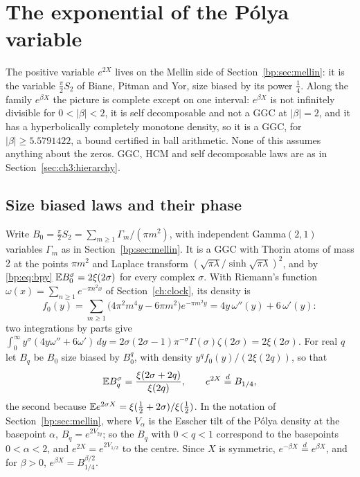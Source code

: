 \section{The exponential of the P\'olya variable}\label{ch:fmexp}

The positive variable $e^{2X}$ lives on the Mellin side of Section~\ref{bp:sec:mellin}: it is the variable $\frac\pi2S_2$ of Biane, Pitman and Yor, size biased by its power $\frac14$. Along the family $e^{\beta X}$ the picture is complete except on one interval: $e^{\beta X}$ is not infinitely divisible for $0<|\beta|<2$, it is self decomposable and not a GGC at $|\beta|=2$, and it has a hyperbolically completely monotone density, so it is a GGC, for $|\beta|\ge5.5791422$, a bound certified in ball arithmetic. None of this assumes anything about the zeros. GGC, HCM and self decomposable laws are as in Section~\ref{sec:ch3:hierarchy}.

\subsection{Size biased laws and their phase}\label{fm:sec:sizebias}

Write $B_0=\frac\pi2S_2=\sum_{m\ge1}\Gamma_m/(\pi m^2)$, with independent Gamma$(2,1)$ variables $\Gamma_m$ as in Section~\ref{bp:sec:mellin}. It is a GGC with Thorin atoms of mass $2$ at the points $\pi m^2$ and Laplace transform $(\sqrt{\pi\lambda}/\sinh\sqrt{\pi\lambda})^2$, and by \eqref{bp:eq:bpy} $\mathbb{E} B_0^\sigma=2\xi(2\sigma)$ for every complex $\sigma$. With Riemann's function $\omega(x)=\sum_{n\ge1}e^{-\pi n^2x}$ of Section~\ref{ch:clock}, its density is
\[
f_0(y)=\sum_{m\ge1}\big(4\pi^2m^4y-6\pi m^2\big)e^{-\pi m^2y}=4y\,\omega''(y)+6\,\omega'(y):
\]
two integrations by parts give $\int_0^\infty y^\sigma(4y\omega''+6\omega')\,dy=2\sigma(2\sigma-1)\pi^{-\sigma}\Gamma(\sigma)\zeta(2\sigma)=2\xi(2\sigma)$. For real $q$ let $B_q$ be $B_0$ size biased by $B_0^q$, with density $y^qf_0(y)/(2\xi(2q))$, so that
\[
\mathbb{E} B_q^\sigma=\frac{\xi(2\sigma+2q)}{\xi(2q)},\qquad e^{2X}\overset d=B_{1/4},
\]
the second because $\mathbb{E} e^{2\sigma X}=\xi(\frac12+2\sigma)/\xi(\frac12)$. In the notation of Section~\ref{bp:sec:mellin}, where $V_\alpha$ is the Esscher tilt of the P\'olya density at the basepoint $\alpha$, $B_q=e^{2V_{2q}}$; so the $B_q$ with $0<q<1$ correspond to the basepoints $0<\alpha<2$, and $e^{2X}=e^{2V_{1/2}}$ to the centre. Since $X$ is symmetric, $e^{-\beta X}\overset d=e^{\beta X}$, and for $\beta>0$, $e^{\beta X}=B_{1/4}^{\beta/2}$.

